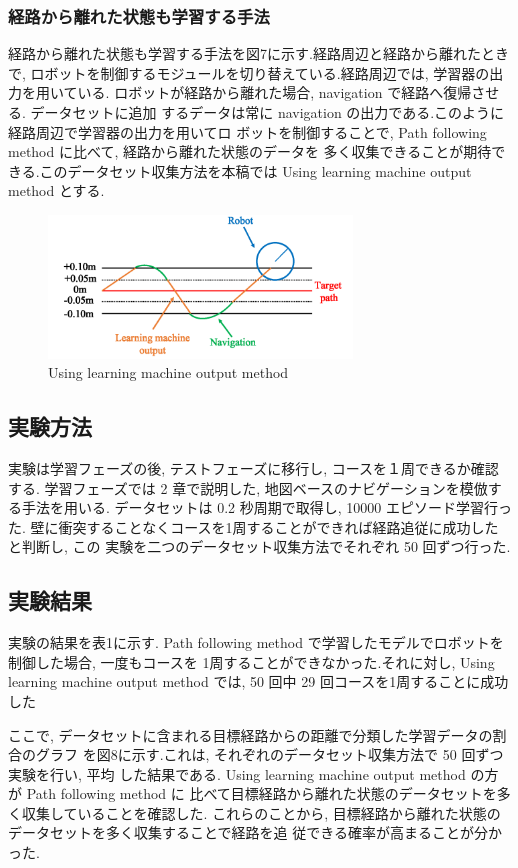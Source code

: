 \documentclass{jarticle}
\begin{document}
\subsubsection{経路から離れた状態も学習する手法}
経路から離れた状態も学習する手法を図7に示す.経路周辺と経路から離れたときで, 
ロボットを制御するモジュールを切り替えている.経路周辺では, 学習器の出力を用いている.
ロボットが経路から離れた場合,  navigation で経路へ復帰させる. データセットに追加
するデータは常に navigation の出力である.このように経路周辺で学習器の出力を用いてロ
ボットを制御することで,  Path following method に比べて, 経路から離れた状態のデータを
多く収集できることが期待できる.このデータセット収集方法を本稿では Using learning
machine output method とする.

\begin{figure}[h!]
  \centering
   \includegraphics[height=38mm]{./figs/dl_use.png}
   \caption{Using learning machine output method}
\end{figure}

\subsection{実験方法}
実験は学習フェーズの後, テストフェーズに移行し, コースを１周できるか確認する.
学習フェーズでは 2 章で説明した, 地図ベースのナビゲーションを模倣する手法を用いる.
データセットは 0.2 秒周期で取得し,  10000 エピソード学習行った.
壁に衝突することなくコースを1周することができれば経路追従に成功したと判断し, この
実験を二つのデータセット収集方法でそれぞれ 50 回ずつ行った.

\subsection{実験結果}
実験の結果を表1に示す. Path following method で学習したモデルでロボットを
制御した場合, 一度もコースを 1周することができなかった.それに対し, Using learning
machine output method では,  50 回中 29 回コースを1周することに成功した

ここで, データセットに含まれる目標経路からの距離で分類した学習データの割合のグラフ
を図8に示す.これは, それぞれのデータセット収集方法で 50 回ずつ実験を行い, 平均
した結果である. Using learning machine output method の方が Path following method に
比べて目標経路から離れた状態のデータセットを多く収集していることを確認した.
これらのことから, 目標経路から離れた状態のデータセットを多く収集することで経路を追
従できる確率が高まることが分かった.
\end{document}
